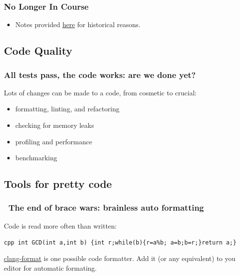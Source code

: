 \subsubsection{No Longer In Course}\label{no-longer-in-course-2}

\begin{itemize}
\itemsep1pt\parskip0pt
\item
  Notes provided \href{sec01Intro}{here} for historical reasons.
\end{itemize}

\subsection{Code Quality}\label{code-quality}

\subsubsection{All tests pass, the code works: are we done
yet?}\label{all-tests-pass-the-code-works-are-we-done-yet}

Lots of changes can be made to a code, from cosmetic to crucial:

\begin{itemize}
\itemsep1pt\parskip0pt
\item
  formatting, linting, and refactoring
\item
  checking for memory leaks
\item
  profiling and performance
\item
  benchmarking
\end{itemize}

\subsection{Tools for pretty code}\label{tools-for-pretty-code}

\subsubsection{~The end of brace wars: brainless auto
formatting}\label{the-end-of-brace-wars-brainless-auto-formatting}

Code is read more often than written:

\texttt{cpp int GCD(int a,int b) \{int r;while(b)\{r=a\%b;   a=b;b=r;\}return a;\}}

\href{https://clang.llvm.org/docs/ClangFormat.html}{clang-format} is one
possible code formatter. Add it (or any equivalent) to you editor for
automatic formating.

